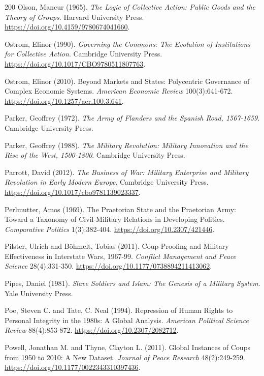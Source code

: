 \documentclass[11pt,letterpaper]{article}
\theoremstyle{definition}
\theoremstyle{remark}
\begin{document}
\begin{thebibliography}{200}
Olson, Mancur (1965). \emph{The Logic of Collective Action: Public Goods and the Theory of Groups}. Harvard University Press. \url{https://doi.org/10.4159/9780674041660}.

Ostrom, Elinor (1990). \emph{Governing the Commons: The Evolution of Institutions for Collective Action}. Cambridge University Press. \url{https://doi.org/10.1017/CBO9780511807763}.

Ostrom, Elinor (2010). Beyond Markets and States: Polycentric Governance of Complex Economic Systems. \emph{American Economic Review} 100(3):641-672. \url{https://doi.org/10.1257/aer.100.3.641}.

Parker, Geoffrey (1972). \emph{The Army of Flanders and the Spanish Road, 1567-1659}. Cambridge University Press.

Parker, Geoffrey (1988). \emph{The Military Revolution: Military Innovation and the Rise of the West, 1500-1800}. Cambridge University Press.

Parrott, David (2012). \emph{The Business of War: Military Enterprise and Military Revolution in Early Modern Europe}. Cambridge University Press. \url{https://doi.org/10.1017/cbo9781139023337}.

Perlmutter, Amos (1969). The Praetorian State and the Praetorian Army: Toward a Taxonomy of Civil-Military Relations in Developing Polities. \emph{Comparative Politics} 1(3):382-404. \url{https://doi.org/10.2307/421446}.

Pilster, Ulrich and B\"ohmelt, Tobias (2011). Coup-Proofing and Military Effectiveness in Interstate Wars, 1967-99. \emph{Conflict Management and Peace Science} 28(4):331-350. \url{https://doi.org/10.1177/0738894211413062}.

Pipes, Daniel (1981). \emph{Slave Soldiers and Islam: The Genesis of a Military System}. Yale University Press.

Poe, Steven C. and Tate, C. Neal (1994). Repression of Human Rights to Personal Integrity in the 1980s: A Global Analysis. \emph{American Political Science Review} 88(4):853-872. \url{https://doi.org/10.2307/2082712}.

Powell, Jonathan M. and Thyne, Clayton L. (2011). Global Instances of Coups from 1950 to 2010: A New Dataset. \emph{Journal of Peace Research} 48(2):249-259. \url{https://doi.org/10.1177/0022343310397436}.


\end{thebibliography}
\end{document}
